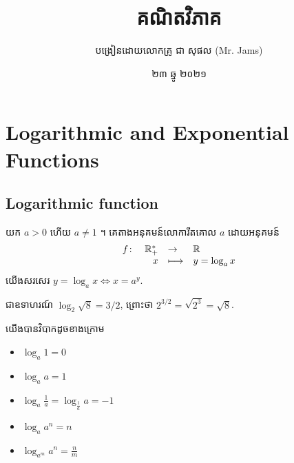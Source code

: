 



\renewcommand{\definitionName}{Definition}


\title{គណិតវិភាគ}
\author{បង្រៀនដោយលោកគ្រូ ជា សុផល (Mr. Jams)}
\date{២៣ ឆ្នូ ២០២១}






\maketitle

\chapter{Logarithmic and Exponential Functions}
\section{Logarithmic function}
\begin{definition}
យក $a>0$ ហើយ $a\neq 1$ ។ គេតាងអនុគមន៍លោការីតគោល $a$ ដោយអនុគមន៍
\[
\begin{array}{lrlll}
f\colon  &\mathbb{R}^{*}_{+}  &\rightarrow  &\mathbb{R}\\
         & x           &\longmapsto & y=\log_ax
\end{array}
\]
យើងសរសេរ $y=\log_ax\iff x=a^y$.
\end{definition}
ជាឧទាហរណ៍ $\log_2\sqrt{8}=3/2$, ព្រោះថា $2^{3/2}=\sqrt{2^3}=\sqrt{8}$.


\begin{corollary}
យើងបានវិបាកដូចខាងក្រោម
\begin{itemize}
\item $\log_a1=0$
\item $\log_aa=1$
\item $\log_a\frac{1}{a}=\log_{\frac{1}{a}}a=-1$
\item $\log_aa^n=n$
\item $\log_{a^m}a^n=\frac{n}{m}$
\end{itemize}
\end{corollary}

